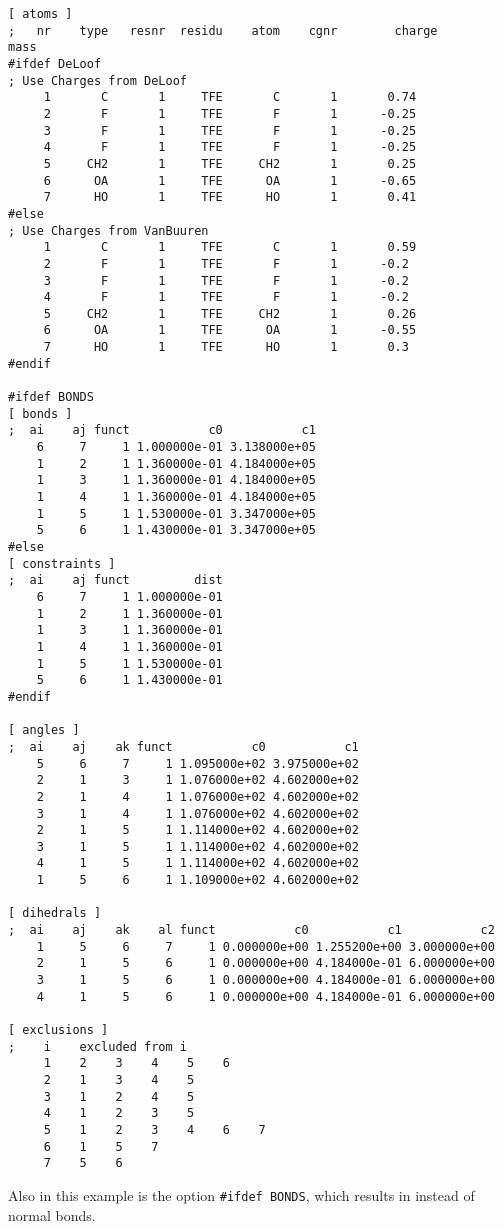 {\small
\begin{verbatim}
[ atoms ]
;   nr    type   resnr  residu    atom    cgnr        charge          mass
#ifdef DeLoof
; Use Charges from DeLoof
     1       C       1     TFE       C       1		 0.74
     2       F       1     TFE       F       1		-0.25
     3       F       1     TFE       F       1		-0.25
     4       F       1     TFE       F       1		-0.25
     5     CH2       1     TFE     CH2       1		 0.25
     6      OA       1     TFE      OA       1		-0.65
     7      HO       1     TFE      HO       1		 0.41
#else
; Use Charges from VanBuuren
     1       C       1     TFE       C       1		 0.59
     2       F       1     TFE       F       1		-0.2
     3       F       1     TFE       F       1		-0.2
     4       F       1     TFE       F       1		-0.2
     5     CH2       1     TFE     CH2       1		 0.26
     6      OA       1     TFE      OA       1		-0.55
     7      HO       1     TFE      HO       1		 0.3
#endif

#ifdef BONDS
[ bonds ]
;  ai    aj funct           c0           c1
    6     7     1 1.000000e-01 3.138000e+05 
    1     2     1 1.360000e-01 4.184000e+05 
    1     3     1 1.360000e-01 4.184000e+05 
    1     4     1 1.360000e-01 4.184000e+05 
    1     5     1 1.530000e-01 3.347000e+05 
    5     6     1 1.430000e-01 3.347000e+05 
#else
[ constraints ]
;  ai    aj funct         dist
    6     7     1 1.000000e-01
    1     2     1 1.360000e-01
    1     3     1 1.360000e-01
    1     4     1 1.360000e-01
    1     5     1 1.530000e-01
    5     6     1 1.430000e-01
#endif

[ angles ]
;  ai    aj    ak funct           c0           c1
    5     6     7     1 1.095000e+02 3.975000e+02 
    2     1     3     1 1.076000e+02 4.602000e+02 
    2     1     4     1 1.076000e+02 4.602000e+02 
    3     1     4     1 1.076000e+02 4.602000e+02 
    2     1     5     1 1.114000e+02 4.602000e+02 
    3     1     5     1 1.114000e+02 4.602000e+02 
    4     1     5     1 1.114000e+02 4.602000e+02 
    1     5     6     1 1.109000e+02 4.602000e+02 

[ dihedrals ]
;  ai    aj    ak    al funct           c0           c1           c2
    1     5     6     7     1 0.000000e+00 1.255200e+00 3.000000e+00 
    2     1     5     6     1 0.000000e+00 4.184000e-01 6.000000e+00 
    3     1     5     6     1 0.000000e+00 4.184000e-01 6.000000e+00 
    4     1     5     6     1 0.000000e+00 4.184000e-01 6.000000e+00 

[ exclusions ]
;    i    excluded from i
     1    2    3    4    5    6
     2    1    3    4    5
     3    1    2    4    5
     4    1    2    3    5
     5    1    2    3    4    6    7
     6    1    5    7
     7    5    6
\end{verbatim}
}
Also in this example is the option {\tt \#ifdef BONDS}, which results
in  instead of normal bonds.

